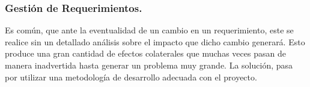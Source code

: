 \documentclass[12pt]{beamer}
\begin{document}
\begin{frame}
\frametitle{Gestión de Requerimientos.}

Es común, que ante la eventualidad de un cambio en un requerimiento, este se realice sin un detallado análisis sobre el \alert{impacto} que dicho cambio generará. Esto produce una gran cantidad de efectos colaterales que muchas veces pasan de manera inadvertida hasta generar un problema muy grande.
La solución, pasa por utilizar una metodología de desarrollo adecuada con el proyecto.
\end{frame}



\end{document}
